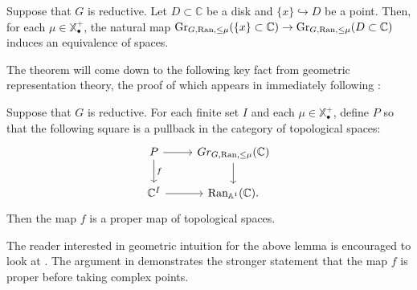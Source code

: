 \begin{prop}\label{prop:diskequiv}
Suppose that $G$ is reductive.  Let $D\subset \mathbb{C}$ be a disk and $\{x \} \hookrightarrow D$ be a point.  Then, for each $\mu\in \mathbb{X}_{\bullet}^+$, the natural map $\operatorname{\mathrm{Gr}}_{G,\operatorname{\mathrm{Ran}}, \leq \mu}(\{x\}\subset \mathbb{C}) \to \operatorname{\mathrm{Gr}}_{G,\operatorname{\mathrm{Ran}}, \leq \mu}(D\subset \mathbb{C})$ induces an equivalence of spaces.

\end{prop}

The theorem will come down to the following key fact from geometric representation theory, the proof of which appears in \cite{BDQuantization} immediately following \cite[5.3.10]{BDQuantization}:

\begin{lem} \label{lem:grproper}
Suppose that $G$ is reductive.  For each finite set $I$ and each $\mu \in \mathbb{X}_{\bullet}^+$, define $P$ so that the following square is a pullback in the category of topological spaces:
$$
\begin{tikzcd}
P \arrow{r} \arrow{d}{f} & Gr_{G,\text{Ran},\le \mu}(\mathbb{C}) \arrow{d} \\
\mathbb{C}^I \arrow{r} & \text{Ran}_{\mathbb{A}^1}(\mathbb{C}).
\end{tikzcd}
$$
Then the map $f$ is a proper map of topological spaces.
\end{lem}

\begin{rmk}
The reader interested in geometric intuition for the above lemma is encouraged to look at \cite[Proposition 1.2.4]{ZhuDemazure}.  The argument in \cite{BDQuantization} demonstrates the stronger statement that the map $f$ is proper before taking complex points.
\end{rmk}

\begin{comment}
We also need the following point-set lemma:
\begin{lem}\label{lem:colimproper}
Let $I$ be a finite indexing category and $\{X_i\}_{i\in I}$ be a diagram of topological spaces indexed by $I$.  Let $X = \colim_{i\in I} X_i$ and suppose $f: Y \to X$ is a map of topological spaces with the property that for all $i\in I$, the natural map $f_i: Y\times_X X_i \to X_i$ is proper.  Then the map $f$ is proper.
\end{lem}
\begin{proof}

\end{proof}
\end{comment}

